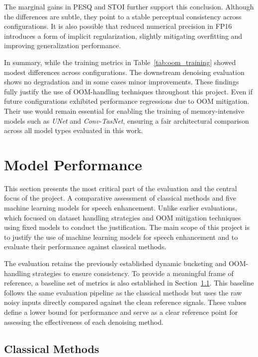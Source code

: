 The marginal gains in PESQ and STOI further support this conclusion. Although the differences are subtle, they point to a stable perceptual consistency across configurations. It is also possible that reduced numerical precision in FP16 introduces a form of implicit regularization, slightly mitigating overfitting and improving generalization performance.

In summary, while the training metrics in Table~\ref{tab:oom_training} showed modest differences across configurations. The downstream denoising evaluation shows no degradation and in some cases minor improvements. These findings fully justify the use of OOM-handling techniques throughout this project. Even if future configurations exhibited performance regressions due to OOM mitigation. Their use would remain essential for enabling the training of memory-intensive models such as \textit{UNet} and \textit{Conv-TasNet}, ensuring a fair architectural comparison across all model types evaluated in this work.

\section{Model Performance}
\label{sec:model_performance}

This section presents the most critical part of the evaluation and the central focus of the project. A comparative assessment of classical methods and five machine learning models for speech enhancement. Unlike earlier evaluations, which focused on dataset handling strategies and OOM mitigation techniques using fixed models to conduct the justification. The main scope of this project is to justify the use of machine learning models for speech enhancement and to evaluate their performance against classical methods.

The evaluation retains the previously established dynamic bucketing and OOM-handling strategies to ensure consistency. To provide a meaningful frame of reference, a baseline set of metrics is also established in Section~\ref{sec:classical_methods}. This baseline follows the same evaluation pipeline as the classical methods but uses the raw noisy inputs directly compared against the clean reference signals. These values define a lower bound for performance and serve as a clear reference point for assessing the effectiveness of each denoising method.

\subsection{Classical Methods}
\label{sec:classical_methods}

